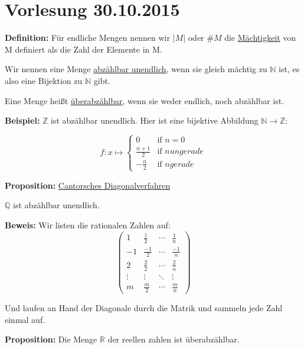 \documentclass[pdftex,12pt,a4paper,fleqn]{scrartcl}
\begin{document}
\newpage

\section{Vorlesung 30.10.2015} %
\label{sec:vorlesung_30_10_2015}

\textbf{Definition:} Für endliche Mengen nennen wir $|M|$ oder $\#M$ die \underline{Mächtigkeit} von M definiert als die Zahl der Elemente in M.

Wir nennen eine Menge \underline{abzählbar unendlich}, wenn sie gleich mächtig zu $\mathbb{N}$ ist, es also eine Bijektion zu $\mathbb{N}$ gibt.

Eine Menge heißt \underline{überabzählbar}, wenn sie weder endlich, noch abzählbar ist.

\textbf{Beispiel:} $\mathbb{Z}$ ist abzählbar unendlich. Hier ist eine bijektive Abbildung $\mathbb{N} \rightarrow \mathbb{Z}$:

\begin{equation*}
f: x \mapsto \begin{cases} 0 &\mbox{if } n = 0 \\ 
                           \frac{n+1}{2} & \mbox{if } n ungerade\\
                           -\frac{n}{2} & \mbox{if } n gerade \end{cases}
\end{equation*}

\textbf{Proposition:} \underline{Cantorsches Diagonalverfahren}

$\mathbb{Q}$ ist abzählbar unendlich.

\textbf{Beweis:} Wir listen die rationalen Zahlen auf:
\begin{equation*}
\begin{pmatrix}
    1 & \frac{1}{2} & \cdots & \frac{1}{n} \\
    -1 & \frac{-1}{2} & \cdots & \frac{-1}{n} \\
    2 & \frac{2}{2} & \cdots & \frac{2}{n} \\
    \vdots  & \vdots  & \ddots & \vdots  \\
    m & \frac{m}{2} & \cdots & \frac{m}{n} 
\end{pmatrix}
\end{equation*}

Und laufen an Hand der Diagonale durch die Matrik und sammeln jede Zahl einmal auf.

\textbf{Proposition:} Die Menge $\mathbb{R}$ der reellen zahlen ist überabzählbar.
\end{document}
